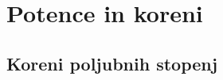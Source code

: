 \chapter{Potence in koreni}




    \section{Koreni poljubnih stopenj}

        


            

                    
            


